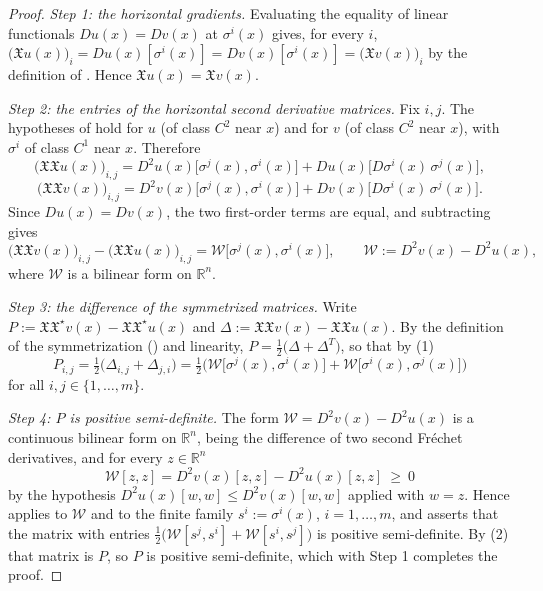\begin{proof}
\emph{Step 1: the horizontal gradients.} Evaluating the equality of linear functionals
$Du(x)=Dv(x)$ at $\sigma^i(x)$ gives, for every $i$,
$\big(\mathfrak{X}u(x)\big)_i=Du(x)[\sigma^i(x)]=Dv(x)[\sigma^i(x)]=\big(\mathfrak{X}v(x)\big)_i$
by the definition of . Hence $\mathfrak{X}u(x)=\mathfrak{X}v(x)$.

\emph{Step 2: the entries of the horizontal second derivative matrices.} Fix $i,j$. The hypotheses
of  hold for $u$ (of class $C^2$ near $x$) and for $v$ (of class $C^2$
near $x$), with $\sigma^i$ of class $C^1$ near $x$. Therefore
$$\big(\mathfrak{X}\mathfrak{X}u(x)\big)_{i,j}
=D^2u(x)\big[\sigma^j(x),\sigma^i(x)\big]+Du(x)\big[D\sigma^i(x)\,\sigma^j(x)\big],$$
$$\big(\mathfrak{X}\mathfrak{X}v(x)\big)_{i,j}
=D^2v(x)\big[\sigma^j(x),\sigma^i(x)\big]+Dv(x)\big[D\sigma^i(x)\,\sigma^j(x)\big].$$
Since $Du(x)=Dv(x)$, the two first-order terms are equal, and subtracting gives
\begin{equation*}\big(\mathfrak{X}\mathfrak{X}v(x)\big)_{i,j}-\big(\mathfrak{X}\mathfrak{X}u(x)\big)_{i,j}
=\mathcal{W}\big[\sigma^j(x),\sigma^i(x)\big],\qquad
\mathcal{W}:=D^2v(x)-D^2u(x), \tag{1}\end{equation*}
where $\mathcal{W}$ is a bilinear form on $\mathbb{R}^n$.

\emph{Step 3: the difference of the symmetrized matrices.} Write
$P:=\mathfrak{X}\mathfrak{X}^\star v(x)-\mathfrak{X}\mathfrak{X}^\star u(x)$ and
$\Delta:=\mathfrak{X}\mathfrak{X}v(x)-\mathfrak{X}\mathfrak{X}u(x)$. By the definition of the
symmetrization () and linearity, $P=\tfrac12\big(\Delta+\Delta^T\big)$, so that
by (1)
\begin{equation*}P_{i,j}=\tfrac12\big(\Delta_{i,j}+\Delta_{j,i}\big)
=\tfrac12\Big(\mathcal{W}\big[\sigma^j(x),\sigma^i(x)\big]
+\mathcal{W}\big[\sigma^i(x),\sigma^j(x)\big]\Big) \tag{2}\end{equation*}
for all $i,j\in\{1,\dots,m\}$.

\emph{Step 4: $P$ is positive semi-definite.} The form $\mathcal{W}=D^2v(x)-D^2u(x)$ is a
continuous bilinear form on $\mathbb{R}^n$, being the difference of two second Fr\'echet
derivatives, and for every $z\in\mathbb{R}^n$
$$\mathcal{W}[z,z]=D^2v(x)[z,z]-D^2u(x)[z,z]\ \geq\ 0$$
by the hypothesis $D^2u(x)[w,w]\leq D^2v(x)[w,w]$ applied with $w=z$. Hence
 applies to $\mathcal{W}$ and to the finite family
$s^i:=\sigma^i(x)$, $i=1,\dots,m$, and asserts that the matrix with entries
$\tfrac12\big(\mathcal{W}[s^j,s^i]+\mathcal{W}[s^i,s^j]\big)$ is positive semi-definite. By (2)
that matrix is $P$, so $P$ is positive semi-definite, which with Step 1 completes the proof.
\end{proof}
